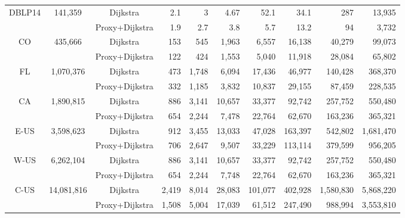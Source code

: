 \begin{table}[t!]
\begin{center}
\begin{tabular}{|c|c|c||r|r|r|r|r|r|r|}
\multirow{2}{*}{DBLP14}& \multirow{2}{*}{141,359} & Dijkstra & 2.1 & 3 & 4.67 & 52.1 & 34.1 & 287 & 13,935 \\ \cline{3-10}
                   &   & Proxy+Dijkstra & 1.9 & 2.7 & 3.8 & 5.7 & 13.2 & 94 & 3,732 \\ \hline\hline
\multirow{2}{*}{CO}&\multirow{2}{*}{435,666}  & Dijkstra & 153 & 545 & 1,963 & 6,557 & 16,138 & 40,279 & 99,073 \\ \cline{3-10}
                  & & Proxy+Dijkstra  & 122 & 424 & 1,553 & 5,040 & 11,918 & 28,084 & 65,802 \\ \hline
\multirow{2}{*}{FL}&\multirow{2}{*}{1,070,376}  & Dijkstra & 473 & 1,748 & 6,094 & 17,436 & 46,977 & 140,428 & 368,370 \\ \cline{3-10}
                   & & Proxy+Dijkstra & 332 & 1,185 & 3,832 & 10,837 & 29,155 & 87,459 & 228,535 \\ \hline
\multirow{2}{*}{CA}&\multirow{2}{*}{1,890,815}  & Dijkstra & 886 & 3,141 & 10,657 & 33,377 & 92,742 & 257,752 & 550,480 \\ \cline{3-10}
                   &  & Proxy+Dijkstra & 654 & 2,244 & 7,478 & 22,764 & 62,670 & 163,236 & 365,321 \\ \hline
\multirow{2}{*}{E-US}&\multirow{2}{*}{3,598,623} & Dijkstra&912 & 3,455 & 13,033 & 47,028 & 163,397 & 542,802 & 1,681,470 \\ \cline{3-10}
                   & & Proxy+Dijkstra & 706 & 2,647 & 9,507 & 33,229 & 113,114 & 379,599 & 956,205 \\ \hline
\multirow{2}{*}{W-US}&\multirow{2}{*}{6,262,104} & Dijkstra & 886 & 3,141 & 10,657 & 33,377 & 92,742 & 257,752 & 550,480 \\ \cline{3-10}
                   & & Proxy+Dijkstra & 654 & 2,244 & 7,748 & 22,764 & 62,670 & 163,236 & 365,321 \\ \hline
\multirow{2}{*}{C-US}&\multirow{2}{*}{14,081,816} & Dijkstra & 2,419 & 8,014 & 28,083 & 101,077 & 402,928 & 1,580,830 & 5,868,220 \\ \cline{3-10}
                  & & Proxy+Dijkstra & 1,508 & 5,004 & 17,039 & 61,512 & 247,490 & 988,994 & 3,553,810 \\ \hline
\end{tabular}
\end{center}
\vspace{-2ex}
\end{table}

